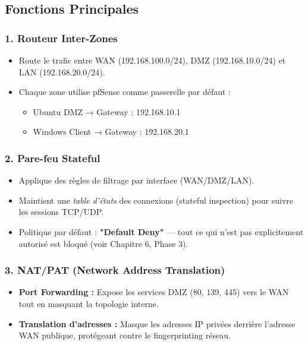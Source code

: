 \documentclass[12pt,a4paper,openany]{report}
\begin{document}
	\subsection{Fonctions Principales}
	
	\subsubsection{1. Routeur Inter-Zones}
	\begin{itemize}
		\item Route le trafic entre WAN (192.168.100.0/24), DMZ (192.168.10.0/24) et LAN (192.168.20.0/24).
		\item Chaque zone utilise pfSense comme passerelle par défaut :
		\begin{itemize}
			\item Ubuntu DMZ → Gateway : 192.168.10.1
			\item Windows Client → Gateway : 192.168.20.1
		\end{itemize}
	\end{itemize}
	
	\subsubsection{2. Pare-feu Stateful}
	\begin{itemize}
		\item Applique des règles de filtrage par interface (WAN/DMZ/LAN).
		\item Maintient une \textit{table d'états} des connexions (stateful inspection) pour suivre les sessions TCP/UDP.
		\item Politique par défaut : \textbf{"Default Deny"} --- tout ce qui n'est pas explicitement autorisé est bloqué (voir Chapitre 6, Phase 3).
	\end{itemize}
	
	\subsubsection{3. NAT/PAT (Network Address Translation)}
	\begin{itemize}
		\item \textbf{Port Forwarding :} Expose les services DMZ (80, 139, 445) vers le WAN tout en masquant la topologie interne.
		\item \textbf{Translation d'adresses :} Masque les adresses IP privées derrière l'adresse WAN publique, protégeant contre le fingerprinting réseau.
	\end{itemize}
	
\end{document}
